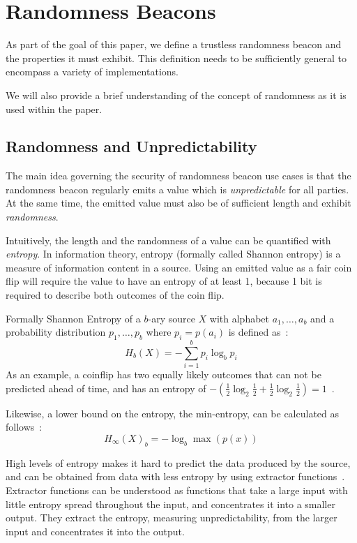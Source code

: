 \section{Randomness Beacons}\label{sec:beacons}

As part of the goal of this paper, we define a trustless randomness beacon and the properties it must exhibit.
This definition needs to be sufficiently general to encompass a variety of implementations.

We will also provide a brief understanding of the concept of randomness as it is used within the paper.

\subsection{Randomness and Unpredictability}\label{sub:beacons_randomness}
The main idea governing the security of randomness beacon use cases is that the randomness beacon regularly emits a value which is \emph{unpredictable} for all parties.
At the same time, the emitted value must also be of sufficient length and exhibit \emph{randomness}.

Intuitively, the length and the randomness of a value can be quantified with \emph{entropy}.
In information theory, entropy (formally called Shannon entropy) is a measure of information content in a source.
Using an emitted value as a fair coin flip will require the value to have an entropy of at least 1, because 1 bit is required to describe both outcomes of the coin flip.

Formally Shannon Entropy of a $b$-ary source $X$ with alphabet ${a_1, \ldots, a_b}$ and a probability distribution ${p_1, \ldots , p_b}$ where $p_i = p(a_i)$ is defined as~\cite{informationtheory}:
$$
H_{b} (X) = -\sum\limits_{i = 1}^b p_{i}\log_{b} p_{i}
$$
As an example, a coinflip has two equally likely outcomes that can not be predicted ahead of time, and has an entropy of $-(\frac{1}{2}\log_2 \frac{1}{2} + \frac{1}{2}\log_2 \frac{1}{2}) = 1$~\cite{informationtheory}.

Likewise, a lower bound on the entropy, the min-entropy, can be calculated as follows~\cite{informationtheory}:
$$
H_\infty(X)_{b} = -\log_{b}\max(p(x))
$$

High levels of entropy makes it hard to predict the data produced by the source, and can be obtained from data with less entropy by using extractor functions~\cite{pseudorandomness}.
Extractor functions can be understood as functions that take a large input with little entropy spread throughout the input, and concentrates it into a smaller output.
They extract the entropy, measuring unpredictability, from the larger input and concentrates it into the output.

